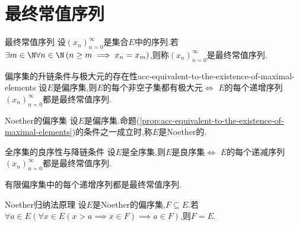 \section{最终常值序列}

\begin{definition}{最终常值序列}{}
	设$\left(x_{n}\right)_{n=0}^{\infty}$是集合$E$中的序列.若$\exists m\in\N\forall n\in\N\left(n\geq m\implies x_{n}=x_{m}\right)$,则称$\left(x_{n}\right)_{n=0}^{\infty}$是最终常值序列.
\end{definition}

\begin{proposition}{偏序集的升链条件与极大元的存在性}{acc-equivalent-to-the-existence-of-maximal-elements}
	设$E$是偏序集,则$E$的每个非空子集都有极大元$\iff$ $E$的每个递增序列$\left(x_{n}\right)_{n=0}^{\infty}$都是最终常值序列.
\end{proposition}

\begin{definition}{Noether的偏序集}{}
	设$E$是偏序集.命题(\ref{prop:acc-equivalent-to-the-existence-of-maximal-elements})的条件之一成立时,称$E$是Noether的.
\end{definition}

\begin{corollary}{全序集的良序性与降链条件}{}
	设$E$是全序集,则$E$是良序集$\iff$ $E$的每个递减序列$\left(x_{n}\right)_{n=0}^{\infty}$都是最终常值序列.
\end{corollary}

\begin{corollary}{}{}
	有限偏序集中的每个递增序列都是最终常值序列.
\end{corollary}

\begin{proposition}{Noether归纳法原理}{}
	设$E$是Noether的偏序集,$F\subseteq E$.若$\forall a\in E\left(\forall x\in E\left(x>a\implies x\in F\right)\implies a\in F\right)$,则$F=E$.
\end{proposition}








































